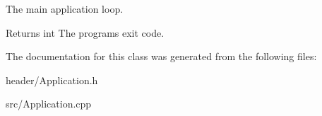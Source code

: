 The main application loop. 

\begin{DoxyReturn}{Returns}
int The program\textquotesingle{}s exit code. 
\end{DoxyReturn}


The documentation for this class was generated from the following files\+:\begin{DoxyCompactItemize}
\item 
header/Application.\+h\item 
src/Application.\+cpp\end{DoxyCompactItemize}

